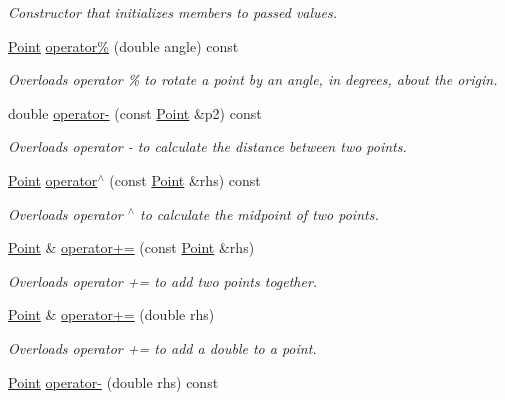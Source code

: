 \begin{DoxyCompactItemize}
\begin{DoxyCompactList}\small\item\em Constructor that initializes members to passed values. \end{DoxyCompactList}\item 
\hyperlink{class_c_s170_1_1_point}{Point} \hyperlink{class_c_s170_1_1_point_ad5a903758cca8bff8f94103ae2f29fba}{operator\%} (double angle) const 
\begin{DoxyCompactList}\small\item\em Overloads operator \% to rotate a point by an angle, in degrees, about the origin. \end{DoxyCompactList}\item 
double \hyperlink{class_c_s170_1_1_point_a78e54cc9aa68c3e9f0698477d7c06365}{operator-\/} (const \hyperlink{class_c_s170_1_1_point}{Point} \&p2) const 
\begin{DoxyCompactList}\small\item\em Overloads operator -\/ to calculate the distance between two points. \end{DoxyCompactList}\item 
\hyperlink{class_c_s170_1_1_point}{Point} \hyperlink{class_c_s170_1_1_point_a9dd0bf2de5a1136c998e4044e88159b3}{operator$^\wedge$} (const \hyperlink{class_c_s170_1_1_point}{Point} \&rhs) const 
\begin{DoxyCompactList}\small\item\em Overloads operator $^\wedge$ to calculate the midpoint of two points. \end{DoxyCompactList}\item 
\hyperlink{class_c_s170_1_1_point}{Point} \& \hyperlink{class_c_s170_1_1_point_a17857b643ad1e7b41cfc151fcae88355}{operator+=} (const \hyperlink{class_c_s170_1_1_point}{Point} \&rhs)
\begin{DoxyCompactList}\small\item\em Overloads operator += to add two points together. \end{DoxyCompactList}\item 
\hyperlink{class_c_s170_1_1_point}{Point} \& \hyperlink{class_c_s170_1_1_point_a525494b935e3914ee5e866c4b7114500}{operator+=} (double rhs)
\begin{DoxyCompactList}\small\item\em Overloads operator += to add a double to a point. \end{DoxyCompactList}\item 
\hyperlink{class_c_s170_1_1_point}{Point} \hyperlink{class_c_s170_1_1_point_a3fa4efacde547a7047fa6833ce6787b9}{operator-\/} (double rhs) const 

\end{DoxyCompactItemize}
